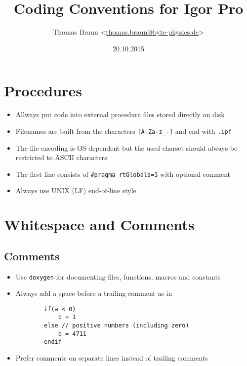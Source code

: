 \documentclass{scrartcl}
\date{20.10.2015}
\author{Thomas Braun <\url{thomas.braun@byte-physics.de}>}
\title{Coding Conventions for Igor Pro}
\begin{document}
%
\maketitle
%
\section{Procedures}
%
\begin{itemize}
	\item Allways put code into external procedure files stored directly on disk
%	
	\item Filenames are built from the characters \texttt{[A-Za-z_-]} and end with \texttt{.ipf}
%	
	\item The file encoding is OS-dependent but the used charset should always be restricted to ASCII characters
%	
	\item The first line consists of \texttt{#pragma rtGlobals=3} with optional comment
%	
	\item Always use UNIX (LF) end-of-line style
\end{itemize}
%
\section{Whitespace and Comments}
%
\subsection*{Comments}
%
\begin{itemize}
	\item Use \texttt{doxygen} for documenting files, functions, macros and constants
%	
	\item Always add a space before a trailing comment as in
	\begin{verbatim}
		if(a < 0)
			b = 1
		else // positive numbers (including zero)
			b = 4711
		endif
	\end{verbatim}
%	
	\item Prefer comments on separate lines instead of trailing comments
%	
\end{itemize}
%	
\end{document}
